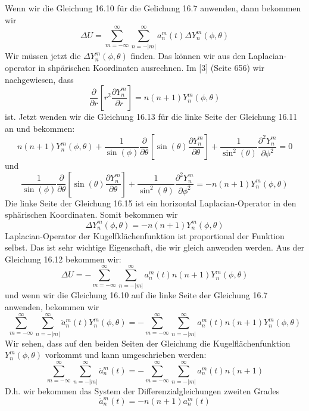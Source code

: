 Wenn wir die Gleichung 16.10 für die Gelichung 16.7 anwenden, dann bekommen wir
\begin{equation}
\Delta{U} = \sum_{m=-\infty}^{\infty}\sum_{n=-|m|}^{\infty}a_n^m(t)\Delta{Y_n^m(\phi, \theta)}
\label{spektral:equation12}
\end{equation}
Wir müssen jetzt die $\Delta{Y_n^m(\phi, \theta)}$ finden.
Das können wir aus den Laplacian-operator in shpärischen Koordinaten ausrechnen.
Im [3] (Seite 656) wir nachgewiesen, dass 
\begin{equation}
\frac{\partial}{\partial{r}}\left[r^2\frac{\partial{Y_n^m}}{\partial{r}}\right] = n(n+1)Y_n^m(\phi, \theta)
\label{spektral:equation13}
\end{equation}
ist.
Jetzt wenden wir die Gleichung 16.13 für die linke Seite der Gleichung 16.11 an und bekommen:
\begin{equation}
n(n+1)Y_n^m(\phi, \theta) + \frac{1}{\sin(\phi)}\frac{\partial}{\partial{\theta}}\left[\sin(\theta)\frac{\partial{Y_n^m}}{\partial{\theta}}\right] + \frac{1}{\sin^2(\theta)}\frac{\partial^2{Y_n^m}}{\partial{\phi^2}} = 0
\label{spektral:equation14}
\end{equation}
und
\begin{equation}
\frac{1}{\sin(\phi)}\frac{\partial}{\partial{\theta}}\left[\sin(\theta)\frac{\partial{Y_n^m}}{\partial{\theta}}\right] + \frac{1}{\sin^2(\theta)}\frac{\partial^2{Y_n^m}}{\partial{\phi^2}} = -n(n+1)Y_n^m(\phi, \theta)
\label{spektral:equation15}
\end{equation}
Die linke Seite der Gleichung 16.15 ist ein horizontal Laplacian-Operator in den sphärischen Koordinaten.
Somit bekommen wir
\begin{equation}
\Delta{Y_n^m(\phi, \theta)} = -n(n+1)Y_n^m(\phi, \theta)
\label{spektral:equation16}
\end{equation}
Laplacian-Operator der Kugelfklächenfunktion ist proportional der Funktion selbst. Das ist sehr wichtige Eigenschaft, die wir gleich anwenden werden. Aus der Gleichung 16.12 bekommen wir:
\begin{equation}
\Delta{U} = -\sum_{m=-\infty}^{\infty}\sum_{n=-|m|}^{\infty}a_n^m(t)n(n+1)Y_n^m(\phi, \theta)
\label{spektral:equation17}
\end{equation}
und wenn wir die Gleichung 16.10 auf die linke Seite der Gleichung 16.7 anwenden, bekommen wir
\begin{equation}
\sum_{m=-\infty}^{\infty}\sum_{n=-|m|}^{\infty}\ddot{a}_n^m(t)Y_n^m(\phi, \theta) = -\sum_{m=-\infty}^{\infty}\sum_{n=-|m|}^{\infty}a_n^m(t)n(n+1)Y_n^m(\phi, \theta)
\label{spektral:equation18}
\end{equation}
Wir sehen, dass auf den beiden Seiten der Gleichung die Kugelflächenfunktion $Y_n^m(\phi, \theta)$ vorkommt und kann umgeschrieben werden:
\begin{equation}
\sum_{m=-\infty}^{\infty}\sum_{n=-|m|}^{\infty}\ddot{a}_n^m(t) = -\sum_{m=-\infty}^{\infty}\sum_{n=-|m|}^{\infty}a_n^m(t)n(n+1)
\label{spektral:equation19}
\end{equation}
D.h. wir bekommen das System der Differenzialgleichungen zweiten Grades
\begin{equation}
\ddot{a}_n^m(t) = -n(n+1)a_n^m(t)
\label{spektral:equation20}
\end{equation}
